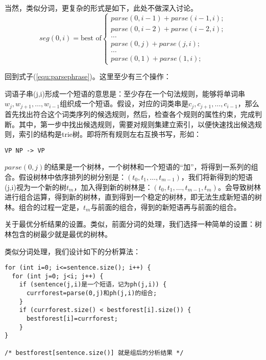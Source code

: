 \documentclass{article}
\begin{document}
\begin{CJK}{UTF8}{gbsn}
当然，类似分词，更复杂的形式是如下，此处不做深入讨论。
\begin{equation}
seg(0,i)=\text{best of} \left\{
\begin{array}{l}
  parse(0,i-1)+parse(i-1,i); \\
  parse(0,i-2)+parse(i-2,i); \\
  \ldots \\
  parse(0,j)+parse(j,i); \\
  \ldots \\
  parse(0,1) + parse(1,i);
\end{array}
\right. \label{equ:parseparse}
\end{equation}

回到式子(\ref{equ:parsephrase})。这里至少有三个操作：
\begin{itemize*}
\item 词语子串(j,i)形成一个短语的意思是：至少存在一个句法规则，能够将单词串$w_j,w_{j+1},\ldots,w_{i-1}$组织成一个短语。假设，对应的词类串是$c_j,c_{j+1},\ldots,c_{i-1}$，那么首先找出符合这个词类序列的候选规则，然后，检查各个规则的属性约束，完成判断。其中，第一步中找出候选规则，需要对规则集建立索引，以便快速找出候选规则，索引的结构是trie树。即将所有规则左右互换书写，形如：
\begin{verbatim}
VP NP -> VP
\end{verbatim}
\item $parse(0,j)$的结果是一个树林，一个树林和一个短语的“加”，将得到一系列的组合。假设树林中依序排列的树分别是：$(t_0,t_1,\ldots,t_{m-1})$，我们将新得到的短语(j,i)视为一个新的树$t_m$，加入得到新的树林是：$(t_0,t_1,\ldots,t_{m-1},t_m)$。会导致树林进行组合运算，得到新的树林，直到得到一个稳定的树林，即无法生成新短语的树林。组合的过程一定是，$t_m$与前面的组合，得到的新短语再与前面的组合。
\item 关于最优分析结果的设置。类似，前面分词的处理，我们选择一种简单的设置：树林包含的树最少就是最优的树林。
\end{itemize*}

类似分词处理，我们设计如下的分析算法：

\begin{verbatim}
for (int i=0; i<=sentence.size(); i++) {
  for (int j=0; j<i; j++) {
    if (sentence(j,i)是一个短语，记为ph(j,i)) {
      currforest=parse(0,j)和ph(j,i)的组合;
    }
    if (currforest.size() < bestforest[i].size()) {
      bestforest[i]=currforest;
    }
}

/* bestforest[sentence.size()] 就是组后的分析结果 */
\end{verbatim}


\end{CJK}
\end{document}

